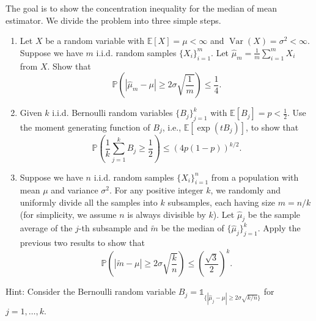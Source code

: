 \begin{exercise}\label{probability:2016:6}
The goal is to show the concentration inequality for the median of mean estimator. We divide the problem into three simple steps.
\begin{enumerate}
    \item Let $X$ be a random variable with $\mathbb{E}[X] = \mu < \infty$ and $\operatorname{Var}(X) = \sigma^2 < \infty$. Suppose we have $m$ i.i.d. random samples $\{X_i\}_{i=1}^m$. Let $\hat{\mu}_m = \frac{1}{m} \sum_{i=1}^m X_i$ from $X$. Show that
    \[
    \mathbb{P} \left( |\hat{\mu}_m - \mu| \geq 2\sigma \sqrt{\frac{1}{m}} \right) \leq \frac{1}{4}.
    \]
    \item Given $k$ i.i.d. Bernoulli random variables $\{B_j\}_{j=1}^k$ with $\mathbb{E}[B_j] = p < \frac{1}{2}$. Use the moment generating function of $B_j$, i.e., $\mathbb{E}[\exp(t B_j)]$, to show that
    \[
    \mathbb{P} \left( \frac{1}{k} \sum_{j=1}^k B_j \geq \frac{1}{2} \right) \leq (4p(1-p))^{k/2}.
    \]
    \item Suppose we have $n$ i.i.d. random samples $\{X_i\}_{i=1}^n$ from a population with mean $\mu$ and variance $\sigma^2$. For any positive integer $k$, we randomly and uniformly divide all the samples into $k$ subsamples, each having size $m = n/k$ (for simplicity, we assume $n$ is always divisible by $k$). Let $\hat{\mu}_j$ be the sample average of the $j$-th subsample and $\tilde{m}$ be the median of $\{\hat{\mu}_j\}_{j=1}^k$. Apply the previous two results to show that
    \[
    \mathbb{P} \left( |\tilde{m} - \mu| \geq 2\sigma \sqrt{\frac{k}{n}} \right) \leq \left(\frac{\sqrt{3}}{2}\right)^k.
    \]
\end{enumerate}
Hint: Consider the Bernoulli random variable $B_j = \mathbb{1}_{\{|\hat{\mu}_j - \mu| \geq 2\sigma \sqrt{k/n}\}}$ for $j = 1, \dots, k$.
\end{exercise}

